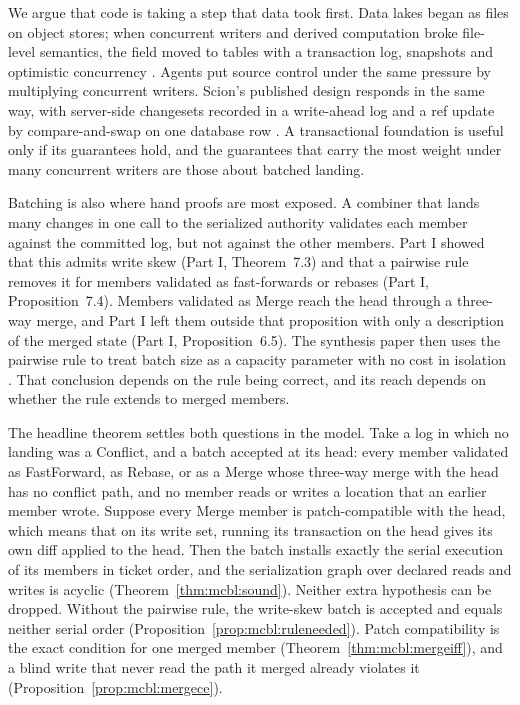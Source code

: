 \documentclass[11pt,letterpaper]{article}
\theoremstyle{definition}
\theoremstyle{remark}
\begin{document}
We argue that code is taking a step that data took first. Data lakes began as files on object stores; when concurrent writers and derived computation broke file-level semantics, the field moved to tables with a transaction log, snapshots and optimistic concurrency \cite{armbrust2020delta}. Agents put source control under the same pressure by multiplying concurrent writers. Scion's published design responds in the same way, with server-side changesets recorded in a write-ahead log and a ref update by compare-and-swap on one database row \cite{anthropic2026scion}. A transactional foundation is useful only if its guarantees hold, and the guarantees that carry the most weight under many concurrent writers are those about batched landing.

Batching is also where hand proofs are most exposed. A combiner that lands many changes in one call to the serialized authority validates each member against the committed log, but not against the other members. Part I showed that this admits write skew (Part I, Theorem~7.3) and that a pairwise rule removes it for members validated as fast-forwards or rebases (Part I, Proposition~7.4). Members validated as Merge reach the head through a three-way merge, and Part I left them outside that proposition with only a description of the merged state (Part I, Proposition~6.5). The synthesis paper then uses the pairwise rule to treat batch size as a capacity parameter with no cost in isolation \cite{long2026synthesis}. That conclusion depends on the rule being correct, and its reach depends on whether the rule extends to merged members.

The headline theorem settles both questions in the model. Take a log in which no landing was a Conflict, and a batch accepted at its head: every member validated as FastForward, as Rebase, or as a Merge whose three-way merge with the head has no conflict path, and no member reads or writes a location that an earlier member wrote. Suppose every Merge member is patch-compatible with the head, which means that on its write set, running its transaction on the head gives its own diff applied to the head. Then the batch installs exactly the serial execution of its members in ticket order, and the serialization graph over declared reads and writes is acyclic (Theorem~\ref{thm:mcbl:sound}). Neither extra hypothesis can be dropped. Without the pairwise rule, the write-skew batch is accepted and equals neither serial order (Proposition~\ref{prop:mcbl:ruleneeded}). Patch compatibility is the exact condition for one merged member (Theorem~\ref{thm:mcbl:mergeiff}), and a blind write that never read the path it merged already violates it (Proposition~\ref{prop:mcbl:mergece}).
\end{document}
